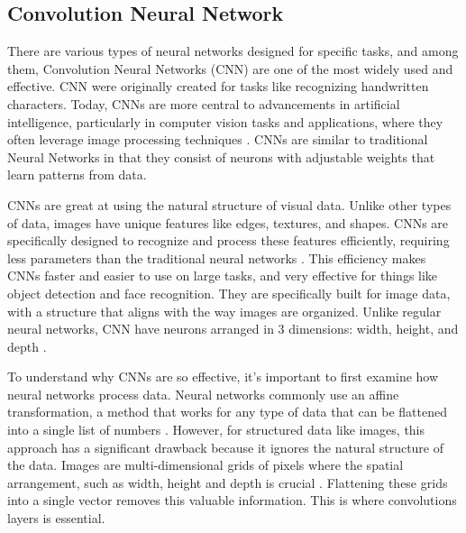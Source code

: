 \subsection{Convolution Neural Network}

There are various types of neural networks designed for specific tasks, and among them, Convolution Neural Networks (CNN) are one of the most widely used and effective. CNN were originally created for tasks like recognizing handwritten characters. Today, CNNs are more central to advancements in artificial intelligence, particularly in computer vision tasks and applications, where they often leverage image processing techniques \cite{CNN_aininsights}. CNNs are similar to traditional Neural Networks in that they consist of neurons with adjustable weights that learn patterns from data.




CNNs are great at using the natural structure of visual data. Unlike other types of data, images have unique features like edges, textures, and shapes. CNNs are specifically designed to recognize and process these features efficiently, requiring less parameters than the traditional neural networks \cite{CNN_aininsights}. This efficiency makes CNNs faster and easier to use on large tasks, and very effective for things like object detection and face recognition. They are specifically built for image data, with a structure that aligns with the way images are organized. Unlike regular neural networks, CNN have neurons arranged in 3 dimensions: width, height, and depth \cite{cs231n_cnn}.

To understand why CNNs are so effective, it's important to first examine how neural networks process data. Neural networks commonly use an affine transformation, a method that works for any type of data that can be flattened into a single list of numbers \cite{deepai_affine_layer}. However, for structured data like images, this approach has a significant drawback because it ignores the natural structure of the data. Images are multi-dimensional grids of pixels where the spatial arrangement, such as width, height and depth is crucial \cite{cs231n_cnn}. Flattening these grids into a single vector removes this valuable information. This is where convolutions layers is essential.

